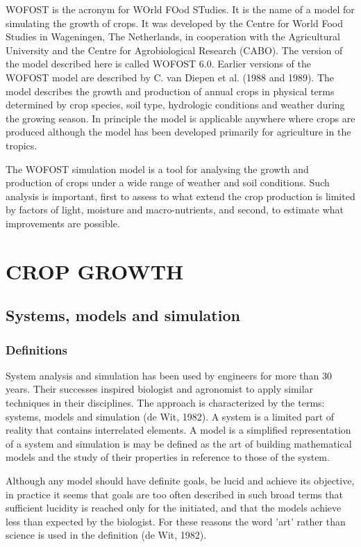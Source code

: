 WOFOST is the acronym for WOrld FOod STudies. It is the name of a model for
simulating the growth of crops. It was developed by the Centre for World Food
Studies in Wageningen, The Netherlands, in cooperation with the Agricultural
University and the Centre for Agrobiological Research (CABO). The version of the
model described here is called WOFOST 6.0. Earlier versions of the WOFOST
model are described by C. van Diepen et al. (1988 and 1989). The model describes
the growth and production of annual crops in physical terms deter\-mined by crop
species, soil type, hydrologic conditions and weather during the growing season. In
principle the model is applicable anywhere where crops are produced although the
model has been developed primarily for agriculture in the tropics.

The WOFOST simulation model is a tool for analysing the growth and production of
crops under a wide range of weather and soil conditions. Such analysis is important,
first to assess to what extend the crop production is limited by factors of light,
moisture and macro-nutrients, and second, to estimate what improvements are
possible.

\chapter{CROP GROWTH} 

\section{Systems, models and simulation}

\subsection{Definitions}
System analysis and simulation has been used by engineers for more than 30 years.
Their successes inspired biologist and agronomist to apply similar techniques in their
disciplines. The approach is characterized by the terms: systems, models and 
simula\-tion (de Wit, 1982). A system is a limited part of reality that contains interrelated
elements. A model is a simplified representation of a system and simulation is may be
defined as the art of building mathemati\-cal models and the study of their properties
in reference to those of the system.

Although any model should have definite goals, be lucid and achieve its objective, in
practice it seems that goals are too often described in such broad terms that sufficient
lucidity  is reached only for the initiated, and that the models achieve less than
expected by the biologist. For these reasons the word 'art' rather than science is used
in the definition (de Wit, 1982).


